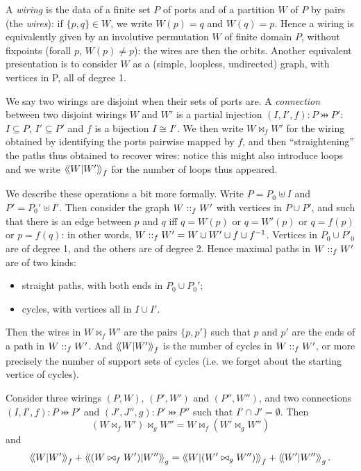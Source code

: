 A \emph{wiring} is the data of a finite set \(P\) of ports and of a
partition \({W}\) of \(P\) by pairs (the \emph{wires}): if
\(\{p,q\}\in{W}\), we write \({W}(p)=q\) and \({W}(q)=p\). Hence a
wiring is equivalently given by an involutive permutation \({W}\) of
finite domain \(P\), without fixpoints (forall \(p\), \({W}(p)\not=p\)):
the wires are then the orbits. Another equivalent presentation is to
consider \({W}\) as a (simple, loopless, undirected) graph, with
vertices in P, all of degree 1.

We say two wirings are disjoint when their sets of ports are. A
\emph{connection} between two disjoint wirings \(W\) and \(W'\) is a
partial injection \((I,I',f):P\pinj P'\): \(I\subseteq P\),
\(I'\subseteq P'\) and \(f\) is a bijection \(I\cong I'\). We then write
\(W\bowtie_f{{W}'}\) for the wiring obtained by identifying the ports
pairwise mapped by \(f\), and then ``straightening'' the paths thus
obtained to recover wires: notice this might also introduce loops and we
write \(\left\langle\!\left\langle W\middle|W'\right\rangle\!\right\rangle_f\) for the number of loops thus appeared.

We describe these operations a bit more formally. Write
\(P = P_0\uplus I\) and \(P' = P_0'\uplus I'\). Then consider the graph
\(W\mathrel{::}_f{{W}'}\) with vertices in \(P\cup P'\), and such that
there is an edge between \(p\) and \(q\) iff \(q={W}(p)\) or
\(q={W'}(p)\) or \(q=f(p)\) or \(p=f(q)\): in other words,
\(W\mathrel{::}_f{{W}'}=W\cup W'\cup f\cup f^{-1}\). Vertices in
\(P_0\cup P'_0\) are of degree 1, and the others are of degree 2. Hence
maximal paths in \(W\mathrel{::}_f{{W}'}\) are of two kinds:
\begin{itemize}
\item straight paths, with both ends in \(P_0\cup P_0'\);
\item cycles, with vertices all in \(I\cup I'\).
\end{itemize}
Then the wires in \(W\bowtie_f{{W}'}\) are the pairs \(\{p,p'\}\) such
that \(p\) and \(p'\) are the ends of a path in \(W\mathrel{::}_f{{W}'}\).
And \(\left\langle\!\left\langle W\middle|W'\right\rangle\!\right\rangle_{f}\) is the number of cycles in
\(W\mathrel{::}_f{{W}'}\), or more precisely the number of support sets of
cycles (i.e. we forget about the starting vertice of cycles).

\begin{lemma}
Consider three wirings \((P,W)\), \((P',W')\) and
\((P'',W'')\), and two connections \((I,I',f):P\pinj P'\) and
\((J',J'',g):P'\pinj P''\) such that \(I'\cap J'=\emptyset\). Then
\begin{equation*}
(W\bowtie_f W')\bowtie_g W'' = W\bowtie_f(W'\bowtie_g W'')
\end{equation*}
and
\begin{equation*}
\Inner{W}{W'}_{f}+\Inner{(W\bowtie_f{{W}'})}{{W}''}_g = \Inner{W}{(W'\bowtie_g W'')}_f+\Inner{{W}'}{{W}''}_g.
\end{equation*}
\end{lemma}
  
